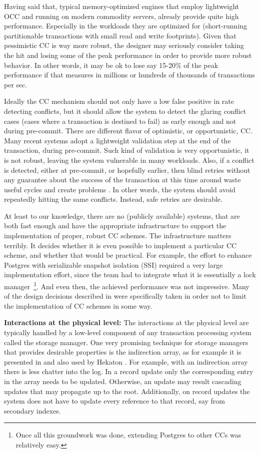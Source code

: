 Having said that, typical memory-optimized engines that employ lightweight OCC and running on modern commodity servers, already provide quite high performance. Especially in the workloads they are optimized for (short-running partitionable transactions with small read and write footprints). Given that pessimistic CC is way more robust, the designer may seriously consider taking the hit and losing some of the peak performance in order to provide more robust behavior. In other words, it may be ok to lose say 15-20\% of the peak performance if that measures in millions or hundreds of thousands of transactions per sec.

Ideally the CC mechanism should not only have a low false positive in rate detecting conflicts, but it should allow the system to detect the glaring conflict cases (cases where a transaction is destined to fail) as early enough and not during pre-commit.
There are different flavor of optimistic, or opportunistic, CC. Many recent systems adopt a lightweight validation step at the end of the transaction, during pre-commit. Such kind of validation is very opportunistic, it is not robust, leaving the system vulnerable in many workloads.
Also, if a conflict is detected, either at pre-commit, or hopefully earlier, then blind retries without any guarantee about the success of the transaction at this time around waste useful cycles and create problems \cite{PortsG12}. In other words, the system should avoid repeatedly hitting the same conflicts. Instead, safe retries are desirable. 

At least to our knowledge, there are no (publicly available) systems, that are both fast enough and have the appropriate infrastructure to support the implementation of proper, robust CC schemes. The infrastructure matters terribly. It decides whether it is even possible to implement a particular CC scheme, and whether that would be practical. For example, the effort to enhance Postgres with serializable snapshot isolation (SSI) required a very large implementation effort, since the team had to integrate what it is essentially a lock manager~\footnote{    Once all this groundwork was done, extending Postgres to other CCs was relatively easy.}. And even then, the achieved performance was not impressive.  Many of the design decisions described in  were specifically taken in order not to limit the implementation of CC schemes in some way.

\vspace{2mm}
{\bf Interactions at the physical level:} 
The interactions at the physical level are typically handled by a low-level component of any transaction processing system called the storage manager. 
One very promising technique for storage managers that provides desirable properties is the indirection array, as for example it is presented in \cite{SadoghiRCB13} and also used by Hekaton \cite{Diaconu+13}.
For example, with an indirection array there is less chatter into the log. In a record update only the corresponding entry in the array needs to be updated. Otherwise, an update may result cascading updates that may propagate up to the root. Additionally, on record updates the system does not have to update every reference to that record, say from secondary indexes. 

